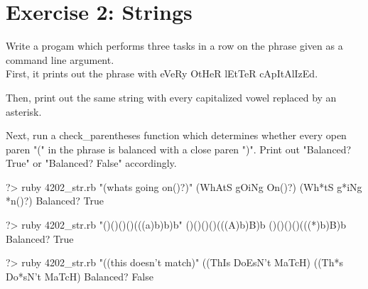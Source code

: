 \documentclass{42-en}
\begin{document}
\nextexercice


\chapter{Exercise 2: Strings}

\exnumber{\exercicenumber}
\makeheaderfiles

Write a progam which performs three tasks in a row on the phrase given as a command line argument.\\

First, it prints out the phrase with eVeRy OtHeR lEtTeR cApItAlIzEd.

Then, print out the same string with every capitalized vowel replaced by an asterisk.

Next, run a check\_parentheses function which determines whether every open paren "(" in the phrase is balanced with a close paren ")". Print out "Balanced? True" or "Balanced? False" accordingly. 

\begin{42console}
	?> ruby 4202_str.rb "(whats going on()?)"
	(WhAtS gOiNg On()?)
	(Wh*tS g*iNg *n()?)
	Balanced? True
\end{42console}

\begin{42console}
	?> ruby 4202_str.rb "()()()()(((a)b)b)b"
	()()()()(((A)b)B)b
	()()()()(((*)b)B)b
	Balanced? True
\end{42console}

\begin{42console}
	?> ruby 4202_str.rb "((this doesn't match)"
	((ThIs DoEsN't MaTcH)
	((Th*s Do*sN't MaTcH)
	Balanced? False
\end{42console}
\end{document}
